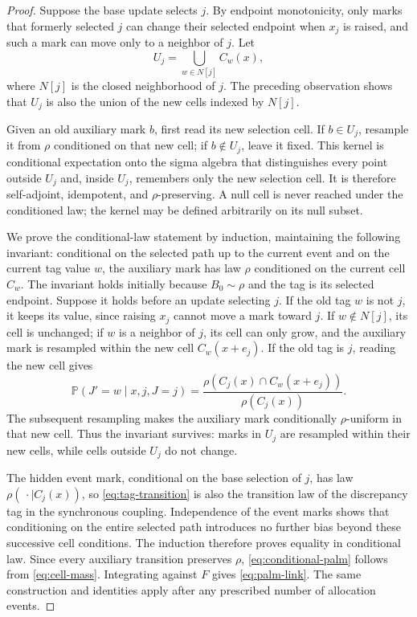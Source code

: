 \documentclass[11pt]{article}
\theoremstyle{remark}
\newcommand{\Pp}{\mathbb{P}}
\begin{document}
\begin{proof}
Suppose the base update selects $j$. By endpoint monotonicity, only marks that formerly selected $j$ can change their selected endpoint when $x_j$ is raised, and such a mark can move only to a neighbor of $j$. Let
\[
 U_j=\bigcup_{w\in N[j]}C_w(x),
\]
where $N[j]$ is the closed neighborhood of $j$. The preceding observation shows that $U_j$ is also the union of the new cells indexed by $N[j]$.

Given an old auxiliary mark $b$, first read its new selection cell. If $b\in U_j$, resample it from $\rho$ conditioned on that new cell; if $b\notin U_j$, leave it fixed. This kernel is conditional expectation onto the sigma algebra that distinguishes every point outside $U_j$ and, inside $U_j$, remembers only the new selection cell. It is therefore self-adjoint, idempotent, and $\rho$-preserving. A null cell is never reached under the conditioned law; the kernel may be defined arbitrarily on its null subset.

We prove the conditional-law statement by induction, maintaining the following invariant: conditional on the selected path up to the current event and on the current tag value $w$, the auxiliary mark has law $\rho$ conditioned on the current cell $C_w$. The invariant holds initially because $B_0\sim\rho$ and the tag is its selected endpoint. Suppose it holds before an update selecting $j$. If the old tag $w$ is not $j$, it keeps its value, since raising $x_j$ cannot move a mark toward $j$. If $w\notin N[j]$, its cell is unchanged; if $w$ is a neighbor of $j$, its cell can only grow, and the auxiliary mark is resampled within the new cell $C_w(x+e_j)$. If the old tag is $j$, reading the new cell gives
\[
 \Pp(J'=w\mid x,j,J=j)
 =\frac{\rho(C_j(x)\cap C_w(x+e_j))}{\rho(C_j(x))}.
 \tag{3.5}\label{eq:tag-transition}
\]
The subsequent resampling makes the auxiliary mark conditionally $\rho$-uniform in that new cell. Thus the invariant survives: marks in $U_j$ are resampled within their new cells, while cells outside $U_j$ do not change.

The hidden event mark, conditional on the base selection of $j$, has law $\rho(\,\cdot\mid C_j(x))$, so \eqref{eq:tag-transition} is also the transition law of the discrepancy tag in the synchronous coupling. Independence of the event marks shows that conditioning on the entire selected path introduces no further bias beyond these successive cell conditions. The induction therefore proves equality in conditional law. Since every auxiliary transition preserves $\rho$, \eqref{eq:conditional-palm} follows from \eqref{eq:cell-mass}. Integrating against $F$ gives \eqref{eq:palm-link}. The same construction and identities apply after any prescribed number of allocation events.
\end{proof}
\end{document}
